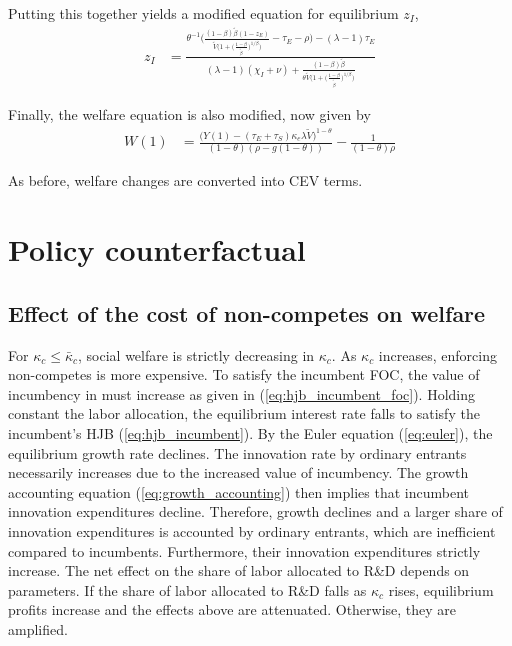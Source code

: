 \documentclass[12pt,english]{article}
\theoremstyle{remark}
\begin{document}
Putting this together yields a modified equation for equilibrium $z_I$,
\begin{align}
z_I &= \frac{\theta^{-1}\Bigg( \frac{(1-\beta)\tilde{\beta}(1- z_E)}{\tilde{V}\big(1 + \big(\frac{1-\beta}{\tilde{\beta}}\big)^{1/\beta}\big)} - \tau_E - \rho \Bigg) - (\lambda-1) \tau_E}{(\lambda - 1) (\chi_I + \nu) + \frac{(1-\beta)\tilde{\beta}}{\theta \tilde{V}\big(1 + \big(\frac{1-\beta}{\tilde{\beta}}\big)^{1/\beta}\big)}}  \label{eq:effort_incumbent_noNCA}
\end{align}

Finally, the welfare equation is also modified, now given by 
\begin{align}
W(1) &= \frac{\big(Y(1) - (\tau_E + \tau_S) \kappa_{e} \lambda \tilde{V}\big)^{1-\theta}}{(1-\theta)(\rho - g(1-\theta))} - \frac{1}{(1-\theta)\rho}  \label{eq:agg_welfare_noNCA}
\end{align}

As before, welfare changes are converted into CEV terms.

\section{Policy counterfactual}

\subsection{Effect of the cost of non-competes on welfare}

For $\kappa_{c} \le \bar{\kappa}_c$, social welfare is strictly decreasing in $\kappa_{c}$. As $\kappa_{c}$ increases, enforcing non-competes is more expensive. To satisfy the incumbent FOC, the value of incumbency in must increase as given in (\ref{eq:hjb_incumbent_foc}). Holding constant the labor allocation, the equilibrium interest rate falls to satisfy the incumbent's HJB (\ref{eq:hjb_incumbent}). By the Euler equation (\ref{eq:euler}), the equilibrium growth rate declines. The innovation rate by ordinary entrants necessarily increases due to the increased value of incumbency. The growth accounting equation (\ref{eq:growth_accounting}) then implies that incumbent innovation expenditures decline. Therefore, growth declines and a larger share of innovation expenditures is accounted by ordinary entrants, which are inefficient compared to incumbents. Furthermore, their innovation expenditures strictly increase. The net effect on the share of labor allocated to R\&D depends on parameters. If the share of labor allocated to R\&D falls as $\kappa_{c}$ rises, equilibrium profits increase and the effects above are attenuated. Otherwise, they are amplified. 
\end{document}
